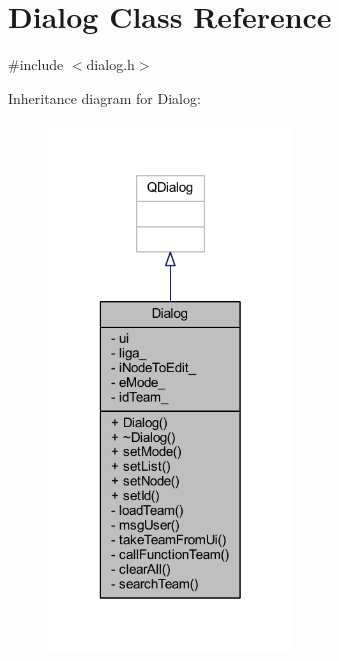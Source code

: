 \hypertarget{class_dialog}{}\section{Dialog Class Reference}
\label{class_dialog}


{\ttfamily \#include $<$dialog.\+h$>$}



Inheritance diagram for Dialog\+:
\nopagebreak
\begin{figure}[H]
\begin{center}
\leavevmode
\includegraphics[width=184pt]{d0/d57/class_dialog__inherit__graph}
\end{center}
\end{figure}


